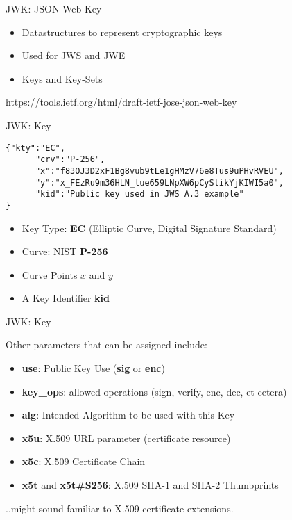 \begin{frame}{JWK: JSON Web Key}

\begin{itemize}
\itemsep1pt\parskip0pt
\item
  Datastructures to represent cryptographic keys
\item
  Used for JWS and JWE
\item
  Keys and Key-Sets
\end{itemize}

https://tools.ietf.org/html/draft-ietf-jose-json-web-key

\end{frame}

\begin{frame}[fragile]{JWK: Key}

\begin{verbatim}
{"kty":"EC",
      "crv":"P-256",
      "x":"f83OJ3D2xF1Bg8vub9tLe1gHMzV76e8Tus9uPHvRVEU",
      "y":"x_FEzRu9m36HLN_tue659LNpXW6pCyStikYjKIWI5a0",
      "kid":"Public key used in JWS A.3 example"
}
\end{verbatim}

\begin{itemize}
\itemsep1pt\parskip0pt
\item
  Key Type: \textbf{EC} (Elliptic Curve, Digital Signature Standard)
\item
  Curve: NIST \textbf{P-256}
\item
  Curve Points \(x\) and \(y\)
\item
  A Key Identifier \textbf{kid}
\end{itemize}

\end{frame}

\begin{frame}{JWK: Key}

Other parameters that can be assigned include:

\begin{itemize}
\itemsep1pt\parskip0pt
\item
  \textbf{use}: Public Key Use (\textbf{sig} or \textbf{enc})
\item
  \textbf{key\_ops}: allowed operations (sign, verify, enc, dec, et
  cetera)
\item
  \textbf{alg}: Intended Algorithm to be used with this Key
\item
  \textbf{x5u}: X.509 URL parameter (certificate resource)
\item
  \textbf{x5c}: X.509 Certificate Chain
\item
  \textbf{x5t} and \textbf{x5t\#S256}: X.509 SHA-1 and SHA-2 Thumbprints
\end{itemize}

..might sound familiar to X.509 certificate extensions.

\end{frame}

